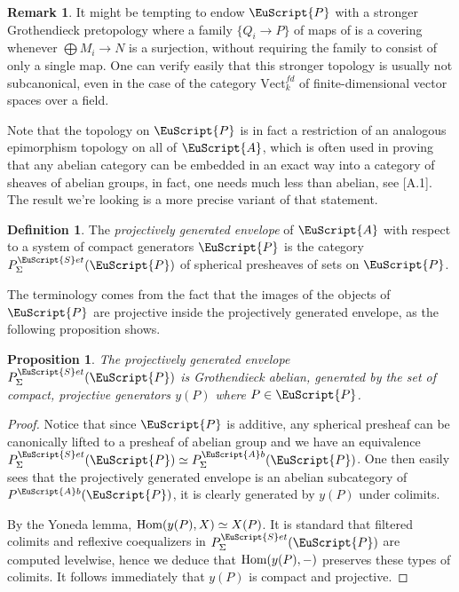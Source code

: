 \documentclass[oneside,a4paper]{amsart}
\newcommand{\euscr}[1]{\EuScript{#1}} %
\newcommand{\acat}{\euscr{A}} %
\newcommand{\pcat}{\euscr{P}} %
\newcommand{\Hom}{\textnormal{Hom}} %
\newcommand{\abeliangroups}{\euscr{A}b} %
\newcommand{\sets}{\euscr{S}et} %
\theoremstyle{plain}
\newtheorem{prop}[thm]{Proposition}
\theoremstyle{definition}
\newtheorem{defin}[thm]{Definition}
\newtheorem{rem}[thm]{Remark}
\theoremstyle{remark}
\begin{document}
\begin{rem}
It might be tempting to endow $\pcat$ with a stronger Grothendieck pretopology where a family $\{ Q_{i} \rightarrow P \}$ of maps of is a covering whenever $\bigoplus M_{i} \rightarrow N$ is a surjection, without requiring the family to consist of only a single map. One can verify easily that this stronger topology is usually not subcanonical, even in the case of the category $\mathrm{Vect}_{k}^{fd}$ of finite-dimensional vector spaces over a field.
\end{rem}

Note that the topology on $\pcat$ is in fact a restriction of an analogous epimorphism topology on all of $\acat$, which is often used in proving that any abelian category can be embedded in an exact way into a category of sheaves of abelian groups, in fact, one needs much less than abelian, see \cite{buhler2010exact}[A.1]. The result we're looking is a more precise variant of that statement. 

\begin{defin}
The \emph{projectively generated envelope} of $\acat$ with respect to a system of compact generators $\pcat$ is the category $P_{\Sigma}^{\sets}(\pcat)$ of spherical presheaves of sets on $\pcat$.
\end{defin}

The terminology comes from the fact that the images of the objects of $\pcat$ are projective inside the projectively generated envelope, as the following proposition shows. 

\begin{prop}
\label{prop:projective_envelope_grothendieck_abelian_with_projective_generators}
The projectively generated envelope $P_{\Sigma}^{\sets}(\pcat)$ is Grothendieck abelian, generated by the set of compact, projective generators $y(P)$ where $P \in \pcat$. 
\end{prop}

\begin{proof}
Notice that since $\pcat$ is additive, any spherical presheaf can be canonically lifted to a presheaf of abelian group and we have an equivalence $P_{\Sigma}^{\sets}(\pcat) \simeq P_{\Sigma}^{\abeliangroups}(\pcat)$. One then easily sees that the projectively generated envelope is an abelian subcategory of $P^{\abeliangroups}(\pcat)$, it is clearly generated by $y(P)$ under colimits. 

By the Yoneda lemma, $\Hom(y(P), X) \simeq X(P)$. It is standard that filtered colimits and reflexive coequalizers in $P_{\Sigma}^{\sets}(\pcat)$ are computed levelwise, hence we deduce that $\Hom(y(P), -)$ preserves these types of colimits. It follows immediately that $y(P)$ is compact and projective.
\end{proof}
\end{document}
